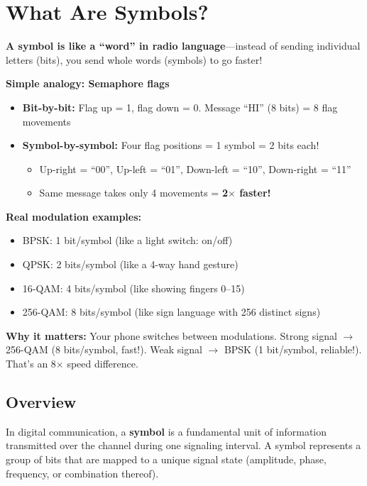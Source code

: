 \chapter{What Are Symbols?}
\label{ch:symbols}

\begin{nontechnical}
\textbf{A symbol is like a ``word'' in radio language}---instead of sending individual letters (bits), you send whole words (symbols) to go faster!

\textbf{Simple analogy: Semaphore flags}
\begin{itemize}
\item \textbf{Bit-by-bit:} Flag up = 1, flag down = 0. Message ``HI'' (8 bits) = 8 flag movements
\item \textbf{Symbol-by-symbol:} Four flag positions = 1 symbol = 2 bits each!
  \begin{itemize}
  \item Up-right = ``00'', Up-left = ``01'', Down-left = ``10'', Down-right = ``11''
  \item Same message takes only 4 movements = \textbf{2$\times$ faster!}
  \end{itemize}
\end{itemize}

\textbf{Real modulation examples:}
\begin{itemize}
\item BPSK: 1 bit/symbol (like a light switch: on/off)
\item QPSK: 2 bits/symbol (like a 4-way hand gesture)
\item 16-QAM: 4 bits/symbol (like showing fingers 0--15)
\item 256-QAM: 8 bits/symbol (like sign language with 256 distinct signs)
\end{itemize}

\textbf{Why it matters:} Your phone switches between modulations. Strong signal $\rightarrow$ 256-QAM (8 bits/symbol, fast!). Weak signal $\rightarrow$ BPSK (1 bit/symbol, reliable!). That's an 8$\times$ speed difference.
\end{nontechnical}

\section{Overview}

In digital communication, a \textbf{symbol} is a fundamental unit of information transmitted over the channel during one signaling interval. A symbol represents a group of bits that are mapped to a unique signal state (amplitude, phase, frequency, or combination thereof).

